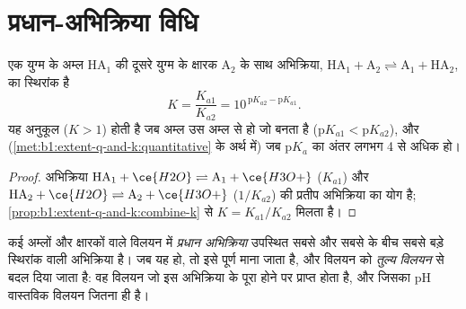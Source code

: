 \section{प्रधान-अभिक्रिया विधि}

\begin{proposition}[अम्ल--क्षारक अभिक्रिया का स्थिरांक]\label{prop:b1:predominant-reaction:k-of-reaction}
एक युग्म के अम्ल $\mathrm{HA}_1$ की दूसरे युग्म के क्षारक
$\mathrm{A}_2$ के साथ अभिक्रिया,
$\mathrm{HA}_1 + \mathrm{A}_2 \rightleftharpoons \mathrm{A}_1 + \mathrm{HA}_2$,
का स्थिरांक है
\[
  K = \frac{K_{a1}}{K_{a2}} = 10^{\,\mathrm{p}K_{a2} - \mathrm{p}K_{a1}} .
\]
यह अनुकूल ($K > 1$) होती है जब अम्ल उस अम्ल से  हो जो
बनता है ($\mathrm{p}K_{a1} < \mathrm{p}K_{a2}$), और  (\cref{met:b1:extent-q-and-k:quantitative}
के अर्थ में) जब $\mathrm{p}K_a$ का अंतर लगभग 4 से अधिक हो।
\end{proposition}

\begin{proof}
अभिक्रिया $\mathrm{HA}_1 + \ce{H2O} \rightleftharpoons
\mathrm{A}_1 + \ce{H3O+}$ ($K_{a1}$) और $\mathrm{HA}_2 +
\ce{H2O} \rightleftharpoons \mathrm{A}_2 + \ce{H3O+}$ ($1/K_{a2}$) की प्रतीप अभिक्रिया का योग है;
\cref{prop:b1:extent-q-and-k:combine-k} से $K = K_{a1}/K_{a2}$ मिलता है।
\end{proof}

\begin{definition}[प्रधान अभिक्रिया, तुल्य विलयन]\label{def:b1:predominant-reaction:predominant-reaction}
कई अम्लों और क्षारकों वाले विलयन में \emph{प्रधान
अभिक्रिया} उपस्थित सबसे  और सबसे  के बीच
सबसे बड़े स्थिरांक वाली अभिक्रिया है। जब यह
 हो, तो इसे पूर्ण माना जाता है, और विलयन को
\emph{तुल्य विलयन} से बदल दिया जाता है: वह विलयन
जो इस अभिक्रिया के पूरा होने पर प्राप्त होता है, और जिसका pH
वास्तविक विलयन जितना ही है।
\end{definition}

